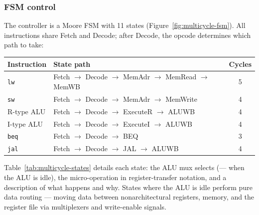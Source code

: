 \documentclass[9pt, a4paper]{extarticle}
\begin{document}
\subsubsection{FSM control} The controller is a Moore FSM with 11 states (Figure~\ref{fig:multicycle-fsm}). All instructions share Fetch and Decode; after Decode, the opcode determines which path to take:

\begin{center}\small
\begin{tabular}{@{}l l c@{}}
    \toprule
    Instruction & State path & Cycles \\
    \midrule
    \texttt{lw}    & Fetch $\to$ Decode $\to$ MemAdr $\to$ MemRead $\to$ MemWB & 5 \\
    \texttt{sw}    & Fetch $\to$ Decode $\to$ MemAdr $\to$ MemWrite & 4 \\
    R-type ALU     & Fetch $\to$ Decode $\to$ ExecuteR $\to$ ALUWB & 4 \\
    I-type ALU     & Fetch $\to$ Decode $\to$ ExecuteI $\to$ ALUWB & 4 \\
    \texttt{beq}   & Fetch $\to$ Decode $\to$ BEQ & 3 \\
    \texttt{jal}   & Fetch $\to$ Decode $\to$ JAL $\to$ ALUWB & 4 \\
    \bottomrule
\end{tabular}
\end{center}

Table~\ref{tab:multicycle-states} details each state: the ALU mux selects (--- when the ALU is idle), the micro-operation in register-transfer notation, and a description of what happens and why. States where the ALU is idle perform pure data routing --- moving data between nonarchitectural registers, memory, and the register file via multiplexers and write-enable signals.
\end{document}
